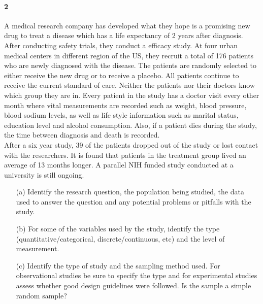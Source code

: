 \documentclass{article}
\begin{document}
\begin{flushleft}
\paragraph{2} A medical research company has developed what they hope is a promising new drug to treat a disease which has a life expectancy of 2 years after diagnosis. After conducting safety trials, they conduct a efficacy study. At four urban medical centers in different region of the US, they recruit a total of 176 patients who are newly diagnosed with the disease. The patients are randomly selected to either receive the new drug or to receive a placebo. All patients continue to receive the current standard of care. Neither the patients nor their doctors know which group they are in. Every patient in the study has a doctor visit every other month where vital measurements are recorded such as weight, blood pressure, blood sodium levels, as well as life style information such as marital status, education level and alcohol consumption. Also, if a patient dies during the study, the time between diagnosis and death is recorded.\\
\medskip
After a six year study, 39 of the patients dropped out of the study or lost contact with the researchers. It is found that patients in the treatment group lived an average of 13 months longer. A parallel NIH funded study conducted at a university is still ongoing.

\begin{itemize}
\item [(a)] Identify the research question, the population being studied, the data used to answer the question and any potential problems or pitfalls with the study.
\vspace{1.5in}
\item[(b)] For some of the variables used by the study, identify the type (quantitative/categorical, discrete/continuous, etc) and the level of measurement.
\vspace{1.5in}
\item[(c)] Identify the type of study and the sampling method used. For observational studies be sure to specify the type and for experimental studies assess whether good design guidelines were followed. Is the sample a simple random sample? 
\end{itemize}


\newpage

\end{flushleft}
\end{document}
